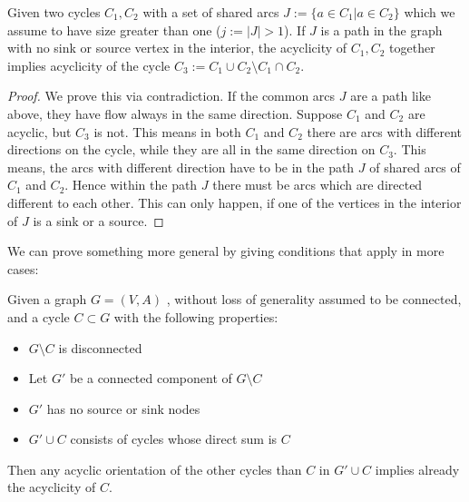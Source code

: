 \begin{prop}
 Given two cycles $C_1, C_2$ with a set of shared arcs $J:=\{a\in C_1|a\in C_2\}$ which we assume to have size greater 
than one ($j:=|J|>1$). If $J$ is a path in the graph with no sink or source vertex in the interior, the acyclicity of 
$C_1, C_2$ together implies acyclicity of the cycle $C_3:=C_1\cup C_2\setminus C_1\cap C_2$.
\end{prop}
\begin{proof}
 We prove this via contradiction. If the common arcs $J$ are a path like above, they have flow always in the same 
direction. Suppose $C_1$ and $C_2$ are acyclic, but $C_3$ is not. This means in both $C_1$ and $C_2$ there are arcs 
with different directions on the cycle, while they are all in the same direction on $C_3$. This means, the arcs with 
different direction have to be in the path $J$ of shared arcs of $C_1$ and $C_2$. Hence within the path $J$ there must 
be arcs which are directed different to each other. This can only happen, if one of the vertices in the interior of $J$ 
is a sink or a source. \Lightning
\end{proof}
We can prove something more general by giving conditions that apply in more cases:
\begin{prop}
 Given a graph $G=(V,A)$ , without loss of generality assumed to be connected, and a cycle $C\subset G$ with the 
following properties:
 \begin{itemize}
  \item $G\setminus C$ is disconnected
  \item Let $G'$ be a connected component of $G\setminus C$ 
  \item $G'$ has no source or sink nodes
  \item $G'\cup C$ consists of cycles whose direct sum is $C$ %
 \end{itemize}
 Then any acyclic orientation of the other cycles than $C$ in $G'\cup C$ implies already the acyclicity of $C$. 

\end{prop}
